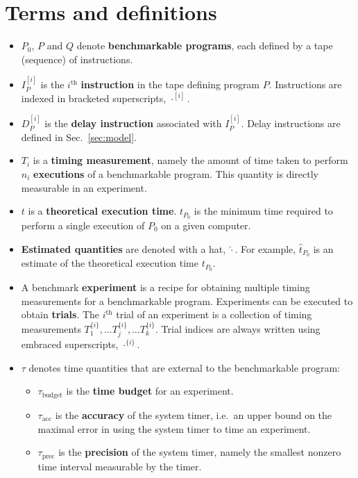 \documentclass[conference]{IEEEtran}
\begin{document}
\section{Terms and definitions}
\label{sec:notation}

\begin{itemize}
    \item
    $P_0$, $P$ and $Q$ denote \textbf{benchmarkable programs}, each defined by
    a tape (sequence) of instructions.

    \item
    $I^{[i]}_{P}$ is the $i^{\textrm{th}}$ \textbf{instruction} in the tape
    defining program $P$.
    Instructions are indexed in bracketed superscripts, $\cdot^{[i]}$.

    \item
    $D^{[i]}_{P}$ is the \textbf{delay instruction} associated with $I^{[i]}_{P}$.
    Delay instructions are defined in Sec.~\ref{sec:model}.

    \item
    $T_i$ is a \textbf{timing measurement}, namely the amount of time taken to
    perform $n_i$ \textbf{executions} of a benchmarkable program. This quantity
    is directly measurable in an experiment.

    \item
    $t$ is a \textbf{theoretical execution time}.
    $t_{P_0}$ is the minimum time required to perform a single execution of
    $P_0$ on a given computer.

    \item
    \textbf{Estimated quantities} are denoted with a hat, $\hat\cdot$.
    For example, $\hat{t}_{P_0}$ is an estimate of the theoretical execution
    time $t_{P_0}$.

    \item
    A benchmark \textbf{experiment} is a recipe for obtaining multiple timing
    measurements for a benchmarkable program. Experiments can be executed to
obtain \textbf{trials}. The
    $i^{\textrm{th}}$ trial of an experiment is a collection of timing measurements
    $T^{\{i\}}_1, \dots T^{\{i\}}_j, \dots T^{\{i\}}_k$. Trial indices are always
    written using embraced superscripts, $\cdot^{\{i\}}$.

    \item
    $\tau$ denotes time quantities that are external to the benchmarkable program:
    \begin{itemize}
        \item $\tau_{\textrm{budget}}$ is the \textbf{time budget} for an experiment.
        \item $\tau_{\textrm{acc}}$ is the \textbf{accuracy} of the system timer, i.e.\ an upper bound on the maximal error in using the system timer to time an experiment.
        \item $\tau_{\textrm{prec}}$ is the \textbf{precision} of the system timer, namely the smallest nonzero time interval measurable by the timer.
    \end{itemize}


\end{itemize}
\end{document}
